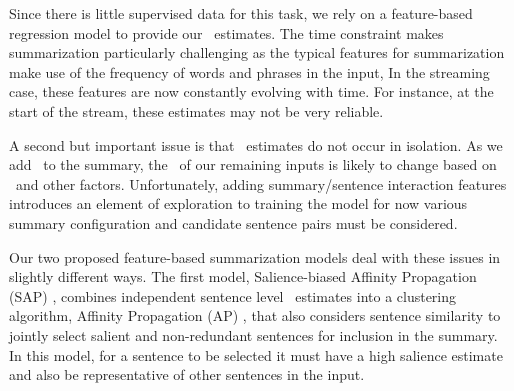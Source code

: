 

Since there is little supervised data for this task, we rely on a  
feature-based regression model to provide our \salience~estimates.   
The time constraint
makes summarization particularly challenging as the typical features for 
summarization make use of the frequency of words and phrases in the input, 
In the streaming case, these features are now constantly evolving with time.
 For instance, at the start of the stream, these estimates may not 
be very reliable. 

A second but important issue is that \salience~estimates do not occur
in isolation. As we add \updates~to the summary, the \salience~of our 
remaining inputs is likely to change based on \redundancy~and other 
factors.
Unfortunately, adding summary/sentence interaction features introduces an element of 
exploration to training the model for now various summary configuration 
and candidate sentence pairs must be considered.



%
%






Our two proposed feature-based summarization models deal with these
issues in slightly different ways. 
The first model, Salience-biased Affinity Propagation (SAP) 
\cite{kedzie2015predicting}, combines 
independent sentence level \salience~estimates into a clustering algorithm,
Affinity Propagation (AP) \cite{frey2007clustering}, that also 
considers sentence similarity to jointly select salient and 
non-redundant sentences for inclusion in the summary. In this model, for 
a sentence to be selected it must have a high salience estimate
and also be
representative of other sentences in the input.

